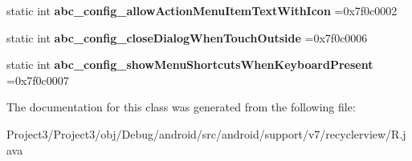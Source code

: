 \begin{DoxyCompactItemize}
static int {\bfseries abc\+\_\+config\+\_\+allow\+Action\+Menu\+Item\+Text\+With\+Icon} =0x7f0c0002
\item 
\mbox{\label{classandroid_1_1support_1_1v7_1_1recyclerview_1_1R_1_1bool_a182eaf64ef29bda83a3a7182b66f2238}} 
static int {\bfseries abc\+\_\+config\+\_\+close\+Dialog\+When\+Touch\+Outside} =0x7f0c0006
\item 
\mbox{\label{classandroid_1_1support_1_1v7_1_1recyclerview_1_1R_1_1bool_ad5f7963ccd84e179a3b58ead675ec541}} 
static int {\bfseries abc\+\_\+config\+\_\+show\+Menu\+Shortcuts\+When\+Keyboard\+Present} =0x7f0c0007
\end{DoxyCompactItemize}


The documentation for this class was generated from the following file\+:\begin{DoxyCompactItemize}
\item 
Project3/\+Project3/obj/\+Debug/android/src/android/support/v7/recyclerview/R.\+java\end{DoxyCompactItemize}
